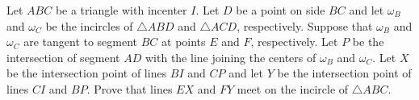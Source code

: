 Let $ABC$ be a triangle with incenter $I$. Let $D$ be a point on side $BC$ and let $\omega_B$ and $\omega_C$ be the incircles of $\triangle ABD$ and $\triangle ACD$, respectively. Suppose that $\omega_B$ and $\omega_C$ are tangent to segment $BC$ at points $E$ and $F$, respectively. Let $P$ be the intersection of segment $AD$ with the line joining the centers of $\omega_B$ and $\omega_C$. Let $X$ be the intersection point of lines $BI$ and $CP$ and let $Y$ be the intersection point of lines $CI$ and $BP$. Prove that lines $EX$ and $FY$ meet on the incircle of $\triangle ABC$.